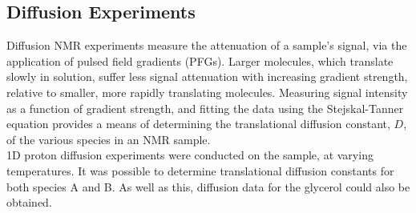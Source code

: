 \subsection{Diffusion Experiments}
Diffusion NMR experiments measure the attenuation of a sample's signal, via the application of pulsed field gradients (PFGs)\cite{RN51}. Larger molecules, which translate slowly in solution, suffer less signal attenuation with increasing gradient strength, relative to smaller, more rapidly translating molecules. Measuring signal intensity as a function of gradient strength, and fitting the data using the Stejskal-Tanner equation\cite{RN42} provides a means of determining the translational diffusion constant, $D$, of the various species in an NMR sample.\\
1D proton diffusion experiments were conducted on the sample, at varying temperatures. It was possible to determine translational diffusion constants for both species A and B. As well as this, diffusion data for the glycerol could also be obtained.

